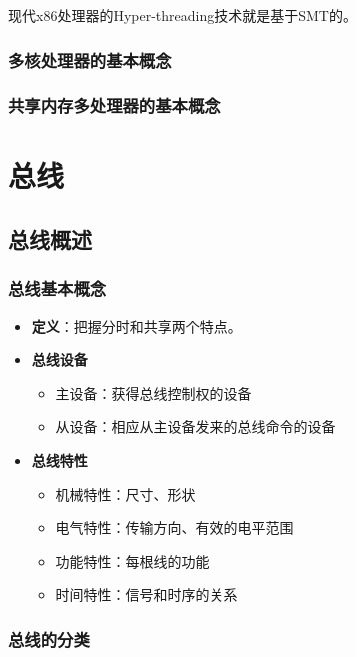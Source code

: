\documentclass[12pt, a4paper, oneside]{ctexart}
\begin{document}
现代x86处理器的Hyper-threading技术就是基于SMT的。

\subsubsection{多核处理器的基本概念}

\subsubsection{共享内存多处理器的基本概念}

\section{总线}

\subsection{总线概述}

\subsubsection{总线基本概念}

\begin{itemize}
  \item {\bf 定义}：把握分时和共享两个特点。
  \item {\bf 总线设备}
  \begin{itemize}
    \item 主设备：获得总线控制权的设备
    \item 从设备：相应从主设备发来的总线命令的设备
  \end{itemize}
  \item {\bf 总线特性}
  \begin{itemize}
    \item 机械特性：尺寸、形状
    \item 电气特性：传输方向、有效的电平范围
    \item 功能特性：每根线的功能
    \item 时间特性：信号和时序的关系
  \end{itemize}
\end{itemize}

\subsubsection{总线的分类}
\end{document}
